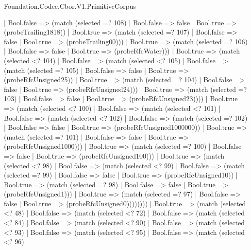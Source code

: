 \begin{lexlean}{Foundation.Codec.Cbor.V1.PrimitiveCorpus}
\begin{semanticmodule}
{                  | Bool.false => (match (selected =? 108)
                    | Bool.false => false
                    | Bool.true => (probeTrailing1818))
                  | Bool.true => (match (selected =? 107)
                    | Bool.false => false
                    | Bool.true => (probeTrailing00)))
                | Bool.true => (match (selected =? 106)
                  | Bool.false => false
                  | Bool.true => (probeRfcWater)))
              | Bool.true => (match (selected <? 104)
                | Bool.false => (match (selected <? 105)
                  | Bool.false => (match (selected =? 105)
                    | Bool.false => false
                    | Bool.true => (probeRfcUnsigned25))
                  | Bool.true => (match (selected =? 104)
                    | Bool.false => false
                    | Bool.true => (probeRfcUnsigned24)))
                | Bool.true => (match (selected =? 103)
                  | Bool.false => false
                  | Bool.true => (probeRfcUnsigned23))))
            | Bool.true => (match (selected <? 100)
              | Bool.false => (match (selected <? 101)
                | Bool.false => (match (selected <? 102)
                  | Bool.false => (match (selected =? 102)
                    | Bool.false => false
                    | Bool.true => (probeRfcUnsigned1000000))
                  | Bool.true => (match (selected =? 101)
                    | Bool.false => false
                    | Bool.true => (probeRfcUnsigned1000)))
                | Bool.true => (match (selected =? 100)
                  | Bool.false => false
                  | Bool.true => (probeRfcUnsigned100)))
              | Bool.true => (match (selected <? 98)
                | Bool.false => (match (selected <? 99)
                  | Bool.false => (match (selected =? 99)
                    | Bool.false => false
                    | Bool.true => (probeRfcUnsigned10))
                  | Bool.true => (match (selected =? 98)
                    | Bool.false => false
                    | Bool.true => (probeRfcUnsigned1)))
                | Bool.true => (match (selected =? 97)
                  | Bool.false => false
                  | Bool.true => (probeRfcUnsigned0))))))))
    | Bool.true => (match (selected <? 48)
      | Bool.false => (match (selected <? 72)
        | Bool.false => (match (selected <? 84)
          | Bool.false => (match (selected <? 90)
            | Bool.false => (match (selected <? 93)
              | Bool.false => (match (selected <? 95)
                | Bool.false => (match (selected <? 96)
}
\end{semanticmodule}
\end{lexlean}
